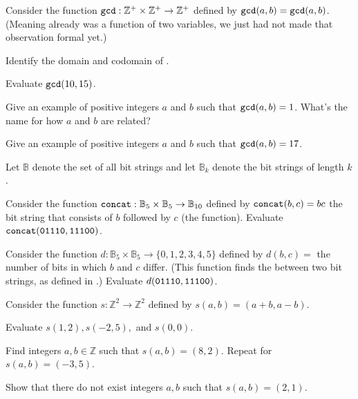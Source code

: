 \begin{exer}[\exerP] %
\label{exer_gcd_as_fn_two_var} 
    Consider the function $\texttt{gcd}: \mathbb{Z}^+ \times \mathbb{Z}^+ \to \mathbb{Z}^+$ defined by $\texttt{gcd}(a,b) = \texttt{gcd}(a,b)$.  (Meaning  already was a function of two variables, we just had not made that observation formal yet.)
        \begin{exerpart}
            \item Identify the domain and codomain of .
            \item Evaluate $\texttt{gcd}(10,15)$.
            \item Give an example of positive integers $a$ and $b$ such that $\texttt{gcd}(a,b) = 1$.  What's the name for how $a$ and $b$ are related?
            \item Give an example of positive integers $a$ and $b$ such that $\texttt{gcd}(a,b) = 17$.
        \end{exerpart}
\end{exer}

\begin{exer}[\exerP] %
\label{exer_cart_prod_fn_bs}
    Let $\mathbb{B}$ denote the set of all bit strings and let $\mathbb{B}_k$ denote the bit strings of length $k$.
    \begin{exerpart}
        \item Consider the function $\texttt{concat}:\mathbb{B}_5 \times \mathbb{B}_5 \to \mathbb{B}_{10}$ defined by $\texttt{concat}(b,c)=bc$ the bit string that consists of $b$ followed by $c$ (the  function).  Evaluate $\texttt{concat}(\texttt{01110},\texttt{11100})$.
        \item Consider the function $d:\mathbb{B}_5 \times \mathbb{B}_5 \to \{0,1,2,3,4,5\}$ defined by $d(b,c)=$ the number of bits in which $b$ and $c$ differ.  (This function finds the  between two bit strings, as defined in .)  Evaluate $d(\texttt{01110},\texttt{11100})$.
    \end{exerpart}
\end{exer}

\begin{exer}[\exerU] %
\label{exer_fn_integer_lattice}
    Consider the function $s: \mathbb{Z}^2 \to \mathbb{Z}^2$ defined by $s(a,b) = (a+b,a-b)$.
        \begin{exerpart}
            \item Evaluate $s(1,2), s(-2,5),$ and $s(0,0)$.
            \item Find integers $a,b \in \mathbb{Z}$ such that $s(a,b) = (8,2)$. Repeat for $s(a,b) = (-3,5)$. 
            \item Show that there do not exist integers $a,b$ such that $s(a,b) = (2,1)$.
        \end{exerpart}
\end{exer}


